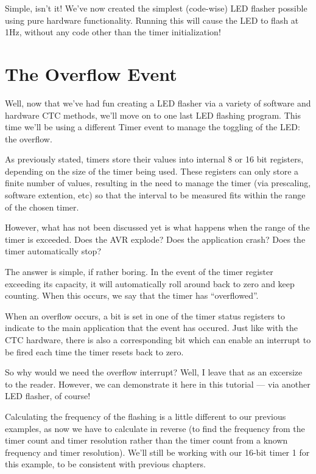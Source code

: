 \documentclass[a4paper,oneside]{book}
\begin{document}
Simple, isn't it! We've now created the simplest (code-wise) LED flasher possible using pure hardware functionality. Running this will cause the LED to flash at 1Hz, without any code other than the timer initialization! 


\label{chp:Overflows}
\chapter{The Overflow Event}

Well, now that we've had fun creating a LED flasher via a variety of software and hardware CTC methods, we'll move on to one last LED flashing program. This time we'll be using a different Timer event to manage the toggling of the LED: the overflow.

As previously stated, timers store their values into internal 8 or 16 bit registers, depending on the size of the timer being used. These registers can only store a finite number of values, resulting in the need to manage the timer (via prescaling, software extention, etc) so that the interval to be measured fits within the range of the chosen timer.

However, what has not been discussed yet is what happens when the range of the timer is exceeded. Does the AVR explode? Does the application crash? Does the timer automatically stop?

The answer is simple, if rather boring. In the event of the timer register exceeding its capacity, it will automatically roll around back to zero and keep counting. When this occurs, we say that the timer has ``overflowed''.

When an overflow occurs, a bit is set in one of the timer status registers to indicate to the main application that the event has occured. Just like with the CTC hardware, there is also a corresponding bit which can enable an interrupt to be fired each time the timer resets back to zero.

So why would we need the overflow interrupt? Well, I leave that as an excersize to the reader. However, we can demonstrate it here in this tutorial --- via another LED flasher, of course!

Calculating the frequency of the flashing is a little different to our previous examples, as now we have to calculate in reverse (to find the frequency from the timer count and timer resolution rather than the timer count from a known frequency and timer resolution). We'll still be working with our 16-bit timer 1 for this example, to be consistent with previous chapters.
\end{document}
